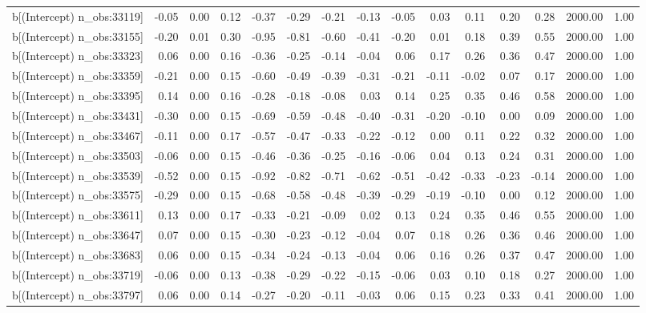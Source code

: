 \begin{table}[ht]
\begin{tabular}{rrrrrrrrrrrrrrr}
  b[(Intercept) n\_obs:33119] & -0.05 & 0.00 & 0.12 & -0.37 & -0.29 & -0.21 & -0.13 & -0.05 & 0.03 & 0.11 & 0.20 & 0.28 & 2000.00 & 1.00 \\ 
  b[(Intercept) n\_obs:33155] & -0.20 & 0.01 & 0.30 & -0.95 & -0.81 & -0.60 & -0.41 & -0.20 & 0.01 & 0.18 & 0.39 & 0.55 & 2000.00 & 1.00 \\ 
  b[(Intercept) n\_obs:33323] & 0.06 & 0.00 & 0.16 & -0.36 & -0.25 & -0.14 & -0.04 & 0.06 & 0.17 & 0.26 & 0.36 & 0.47 & 2000.00 & 1.00 \\ 
  b[(Intercept) n\_obs:33359] & -0.21 & 0.00 & 0.15 & -0.60 & -0.49 & -0.39 & -0.31 & -0.21 & -0.11 & -0.02 & 0.07 & 0.17 & 2000.00 & 1.00 \\ 
  b[(Intercept) n\_obs:33395] & 0.14 & 0.00 & 0.16 & -0.28 & -0.18 & -0.08 & 0.03 & 0.14 & 0.25 & 0.35 & 0.46 & 0.58 & 2000.00 & 1.00 \\ 
  b[(Intercept) n\_obs:33431] & -0.30 & 0.00 & 0.15 & -0.69 & -0.59 & -0.48 & -0.40 & -0.31 & -0.20 & -0.10 & 0.00 & 0.09 & 2000.00 & 1.00 \\ 
  b[(Intercept) n\_obs:33467] & -0.11 & 0.00 & 0.17 & -0.57 & -0.47 & -0.33 & -0.22 & -0.12 & 0.00 & 0.11 & 0.22 & 0.32 & 2000.00 & 1.00 \\ 
  b[(Intercept) n\_obs:33503] & -0.06 & 0.00 & 0.15 & -0.46 & -0.36 & -0.25 & -0.16 & -0.06 & 0.04 & 0.13 & 0.24 & 0.31 & 2000.00 & 1.00 \\ 
  b[(Intercept) n\_obs:33539] & -0.52 & 0.00 & 0.15 & -0.92 & -0.82 & -0.71 & -0.62 & -0.51 & -0.42 & -0.33 & -0.23 & -0.14 & 2000.00 & 1.00 \\ 
  b[(Intercept) n\_obs:33575] & -0.29 & 0.00 & 0.15 & -0.68 & -0.58 & -0.48 & -0.39 & -0.29 & -0.19 & -0.10 & 0.00 & 0.12 & 2000.00 & 1.00 \\ 
  b[(Intercept) n\_obs:33611] & 0.13 & 0.00 & 0.17 & -0.33 & -0.21 & -0.09 & 0.02 & 0.13 & 0.24 & 0.35 & 0.46 & 0.55 & 2000.00 & 1.00 \\ 
  b[(Intercept) n\_obs:33647] & 0.07 & 0.00 & 0.15 & -0.30 & -0.23 & -0.12 & -0.04 & 0.07 & 0.18 & 0.26 & 0.36 & 0.46 & 2000.00 & 1.00 \\ 
  b[(Intercept) n\_obs:33683] & 0.06 & 0.00 & 0.15 & -0.34 & -0.24 & -0.13 & -0.04 & 0.06 & 0.16 & 0.26 & 0.37 & 0.47 & 2000.00 & 1.00 \\ 
  b[(Intercept) n\_obs:33719] & -0.06 & 0.00 & 0.13 & -0.38 & -0.29 & -0.22 & -0.15 & -0.06 & 0.03 & 0.10 & 0.18 & 0.27 & 2000.00 & 1.00 \\ 
  b[(Intercept) n\_obs:33797] & 0.06 & 0.00 & 0.14 & -0.27 & -0.20 & -0.11 & -0.03 & 0.06 & 0.15 & 0.23 & 0.33 & 0.41 & 2000.00 & 1.00 \\ 

\end{tabular}
\end{table}
